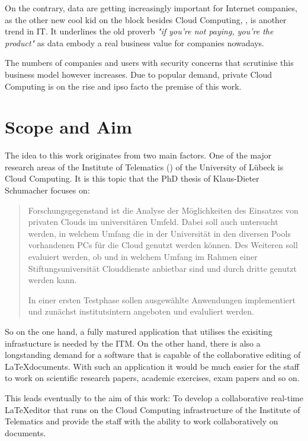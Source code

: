 On the contrary, data are getting increasingly important for Internet companies, as the other new cool kid on the block besides Cloud Computing, , is another trend in IT. It underlines the old proverb \textit{"if you're not paying, you're the product"} as data embody a real business value for companies nowadays.

The numbers of companies and users with security concerns that scrutinise this business model however increases. Due to popular demand, private Cloud Computing is on the rise and ipso facto the premise of this work.

\pagebreak

\section{Scope and Aim}
\label{sec:scope-and-aim}

The idea to this work originates from two main factors. One of the major research areas of the Institute of Telematics () of the University of Lübeck is Cloud Computing. It is this topic that the PhD thesis of Klaus-Dieter Schumacher focuses on: 

\begin{quote}
Forschungsgegenstand ist die Analyse der Möglichkeiten des Einsatzes von privaten Clouds im universitären Umfeld. Dabei soll auch untersucht werden, in welchem Umfang die in der Universität in den diversen Pools vorhandenen PCs für die Cloud genutzt werden können. Des Weiteren soll evaluiert werden, ob und in welchem Umfang im Rahmen einer Stiftungsuniversität Clouddienste anbietbar sind und durch dritte genutzt werden kann.

In einer ersten Testphase sollen ausgewählte Anwendungen implementiert und zunächst institutsintern angeboten und evaluliert werden.
\end{quote}

So on the one hand, a fully matured application that utilises the exisiting infrastucture is needed by the ITM. On the other hand, there is also a longstanding demand for a software that is capable of the collaborative editing of \LaTeX documents. With such an application it would be much easier for the staff to work on scientific research papers, academic exercises, exam papers and so on.

This leads eventually to the aim of this work: To develop a collaborative real-time \LaTeX editor that runs on the Cloud Computing infrastructure of the Institute of Telematics and provide the staff with the ability to work collaboratively on documents.

